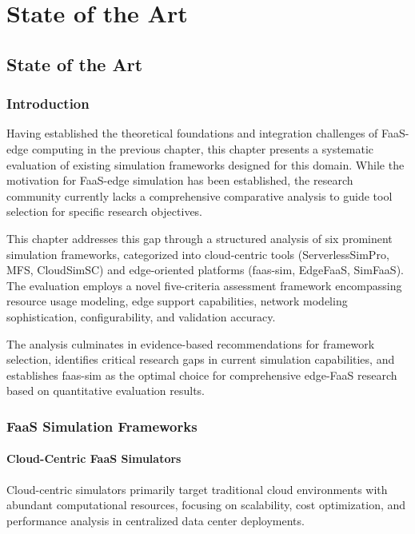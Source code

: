 \part{State of the Art}
\chapter{State of the Art}

\section{Introduction}

Having established the theoretical foundations and integration challenges of FaaS-edge computing in the previous chapter, this chapter presents a systematic evaluation of existing simulation frameworks designed for this domain. While the motivation for FaaS-edge simulation has been established, the research community currently lacks a comprehensive comparative analysis to guide tool selection for specific research objectives.

This chapter addresses this gap through a structured analysis of six prominent simulation frameworks, categorized into cloud-centric tools (ServerlessSimPro, MFS, CloudSimSC) and edge-oriented platforms (faas-sim, EdgeFaaS, SimFaaS). The evaluation employs a novel five-criteria assessment framework encompassing resource usage modeling, edge support capabilities, network modeling sophistication, configurability, and validation accuracy.

The analysis culminates in evidence-based recommendations for framework selection, identifies critical research gaps in current simulation capabilities, and establishes faas-sim as the optimal choice for comprehensive edge-FaaS research based on quantitative evaluation results.

\section{FaaS Simulation Frameworks}


\subsection{Cloud-Centric FaaS Simulators}

Cloud-centric simulators primarily target traditional cloud environments with abundant computational resources, focusing on scalability, cost optimization, and performance analysis in centralized data center deployments.


